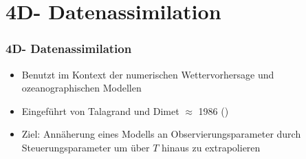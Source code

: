 \section[Datenassimilation]{4D- Datenassimilation}
\begin{frame}[<+->]
\frametitle{4D- Datenassimilation}
    \begin{itemize}
     \item Benutzt im Kontext der numerischen Wettervorhersage und ozeanographischen Modellen
     \item Eingeführt von Talagrand und Dimet $\approx$ 1986 (\cite{dimet1986variational})
     \item Ziel: Annäherung eines Modells an Observierungsparameter durch Steuerungsparameter um über $T$ hinaus zu extrapolieren
    \end{itemize}

\end{frame}

